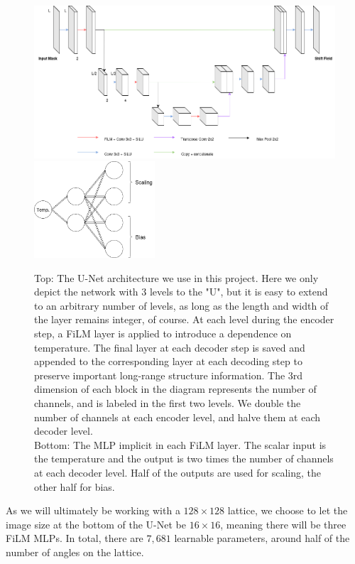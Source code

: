 \documentclass[12pt]{article}
\begin{document}
\begin{figure}
	\begin{center}
	\includegraphics[width=\textwidth]{figures/UNet.png} \\
	\vspace{1cm}
	\includegraphics[width=0.4\textwidth]{figures/FiLM.png}
	\end{center}
	\caption{Top: The U-Net architecture we use in this project. Here we only depict the network with 3 levels to the "U", but
	it is easy to extend to an arbitrary number of levels, as long as the length and width of the layer remains integer, of course.
	At each level during the encoder step, a FiLM layer is applied to introduce a dependence on temperature. The final layer
	at each decoder step is saved and appended to the corresponding layer at each decoding step to preserve important long-range
	structure information. The 3rd dimension of each block in the diagram represents the number of channels, and is labeled in the first two
	levels. We double the number of channels at each encoder level, and halve them at each decoder level. \\
	Bottom: The MLP implicit in each FiLM layer. The scalar input is the temperature and the output is two times the number of
	channels at each decoder level. Half of the outputs are used for scaling, the other half for bias.}
	\label{fig:unet}
\end{figure}

As we will ultimately be working with a $128\times128$ lattice, we choose to let the image size at the bottom of the U-Net
be $16\times16$, meaning there will be three FiLM MLPs. In total, there are $7,681$ learnable parameters, around
half of the number of angles on the lattice. 
\end{document}
